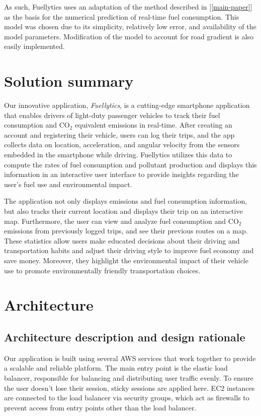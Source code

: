 \documentclass[11pt, oneside]{article}
\begin{document}
As such, Fuellytics uses an adaptation of the method described in [\ref*{main-paper}] as the basis for the numerical prediction of real-time fuel consumption.  This model was chosen due to its simplicity, relatively low error, and availability of the model parameters.  Modification of the model to account for road gradient is also easily implemented.

\section{Solution summary}

Our innovative application, \textit{Fuellytics}, is a cutting-edge smartphone application that enables drivers of light-duty passenger vehicles to track their fuel consumption and CO$_2$ equivalent emissions in real-time.  After creating an account and registering their vehicle, users can log their trips, and the app collects data on location, acceleration, and angular velocity from the sensors embedded in the smartphone while driving.  Fuellytics utilizes this data to compute the rates of fuel consumption and pollutant production and displays this information in an interactive user interface to provide insights regarding the user's fuel use and environmental impact. 

The application not only displays emissions and fuel consumption information, but also tracks their current location and displays their trip on an interactive map.  Furthermore, the user can view and analyze fuel consumption and CO$_2$ emissions from previously logged trips, and see their previous routes on a map. These statistics allow users make educated decisions about their driving and transportation habits and adjust their driving style to improve fuel economy and save money.  Moreover, they highlight the environmental impact of their vehicle use to promote environmentally friendly transportation choices.

\section{Architecture}

\subsection{Architecture description and design rationale}

Our application is built using several AWS services that work together to provide a scalable and reliable platform. The main entry point is the elastic load balancer, responsible for balancing and distributing user traffic evenly. To ensure the user doesn't lose their session, sticky sessions are applied here. EC2 instances are connected to the load balancer via security groups, which act as firewalls to prevent access from entry points other than the load balancer.
\end{document}
